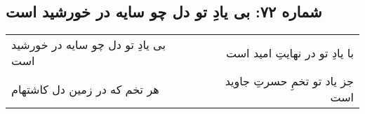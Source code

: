 \begin{center}
\section*{شماره ۷۲: بی یادِ تو دل چو سایه در خورشید است}
\label{sec:072}
\begin{longtable}{l p{0.5cm} r}
بی یادِ تو دل چو سایه در خورشید است
&&
با یادِ تو در نهایتِ امید است
\\
هر تخم که در زمین دل کاشتهام
&&
جز یاد تو تخمِ حسرتِ جاوید است
\\
\end{longtable}
\end{center}
